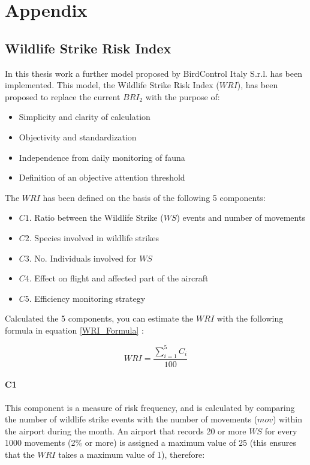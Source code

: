 \chapter*{Appendix}

\section*{Wildlife Strike Risk Index}
In this thesis work a further model proposed by BirdControl Italy S.r.l. has been implemented.
This model, the Wildlife Strike Risk Index ($WRI$), has been proposed to replace the current $BRI_2$ with the purpose of:

\begin{itemize}
    \item Simplicity and clarity of calculation
    \item Objectivity and standardization
    \item Independence from daily monitoring of fauna
    \item Definition of an objective attention threshold
\end{itemize}
The $WRI$ has been defined on the basis of the following 5 components:

\begin{itemize}
    \item $C1$. Ratio between the Wildlife Strike ($WS$) events and number of movements
    \item $C2$. Species involved in wildlife strikes 
    \item $C3$. No. Individuals involved for $WS$
    \item $C4$. Effect on flight and affected part of the aircraft
    \item $C5$. Efficiency monitoring strategy
\end{itemize}
Calculated the 5 components, you can estimate the $WRI$ with the following formula in equation \ref{WRI_Formula} :

\begin{equation}\label{WRI_Formula}
WRI= \frac{\sum_{i=1}^5 C_{i}}{100}
\end{equation}

\subsubsection{C1}

This component is a measure of risk frequency, and is calculated by comparing the number of wildlife strike events with the number of movements ($mov$) within the airport during the month.
An airport that records 20 or more $WS$ for every 1000 movements (2\% or more) is assigned a maximum value of 25 (this ensures that the $WRI$ takes a maximum value of 1), therefore:

